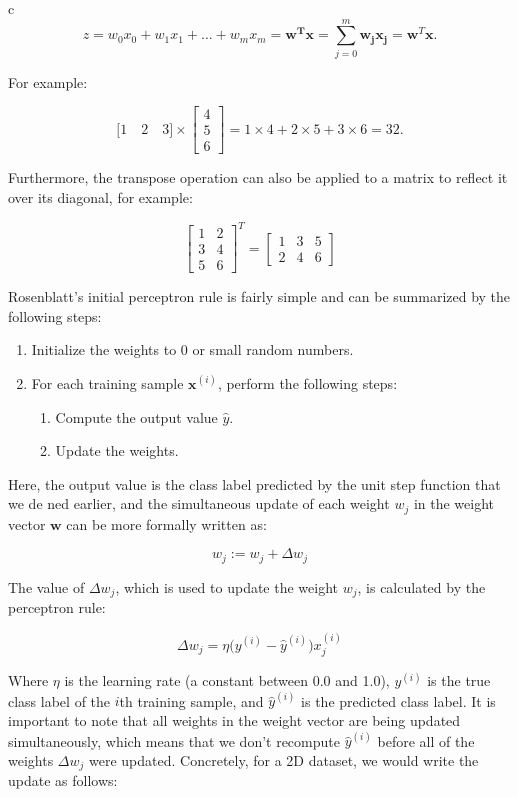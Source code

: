 \documentclass[letterpaper]{report}
\begin{document}
c\[
z  = w_0 x_0 + w_1 x_1 + \dots + w_m x_m = \mathbf{w^T x} = \sum_{j=0}^{m} \mathbf{w_j} \mathbf{x_j} = \mathbf{w}^T \mathbf{x}.
\]

For example:

\[
\big[1 \quad 2 \quad 3 \big] \times \begin{bmatrix}
    4  \\
    5  \\
    6
\end{bmatrix} = 1 \times 4 + 2 \times 5 + 3 \times 6 = 32.
\]

Furthermore, the transpose operation can also be applied to a matrix to
reflect it over its diagonal, for example:

\[
 \begin{bmatrix}
    1 & 2  \\
    3 & 4  \\
    5 & 6
\end{bmatrix}^T =  \begin{bmatrix}
    1 & 3 & 5 \\
    2 & 4 & 6
\end{bmatrix}
\]

Rosenblatt's initial perceptron rule is fairly simple and can be summarized by the following steps:

\begin{enumerate}  
\item Initialize the weights to 0 or small random numbers.
\item For each training sample $\mathbf{x}^{(i)}$, perform the following steps:
\begin{enumerate}  
\item Compute the output value $\hat{y}$.
\item Update the weights.
\end{enumerate}
\end{enumerate}

Here, the output value is the class label predicted by the unit step function that we de ned earlier, and the simultaneous update of each weight $w_j$ in the weight vector $\mathbf{w}$ can be more formally written as:

\[
w_j := w_j + \Delta w_j
\]

The value of $\Delta w_j$, which is used to update the weight $w_j$, is calculated by the perceptron rule:

\[
\Delta w_j = \eta \bigg( y^{(i)} - \hat{y}^{(i)} \bigg)x_{j}^{(i)}
\]

Where $\eta$ is the learning rate (a constant between 0.0 and 1.0), $y^{(i)}$ is the true class label of the $i$th training sample, and $\hat{y}^{(i)}$ is the predicted class label. It is important to note that all weights in the weight vector are being updated simultaneously, which means that we don't recompute $\hat{y}^{(i)}$ before all of the weights $\Delta w_j$ were updated. Concretely, for a 2D dataset, we would write the update as follows:
\end{document}
